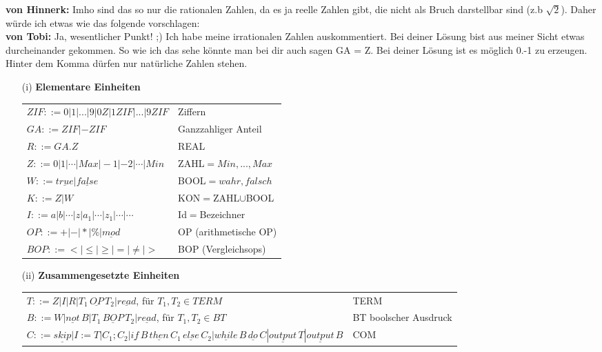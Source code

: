 \documentclass[ngerman,a4paper]{report}
\begin{document}
\textbf{von Hinnerk:}
Imho sind das so nur die rationalen Zahlen, da es ja reelle Zahlen gibt, die nicht als Bruch darstellbar sind (z.b $\sqrt{2}$).
Daher würde ich etwas wie das folgende vorschlagen:\\
\textbf{von Tobi:}
Ja, wesentlicher Punkt! ;) Ich habe meine irrationalen Zahlen auskommentiert. Bei deiner Lösung bist aus meiner Sicht etwas durcheinander gekommen. So wie ich das sehe könnte man bei dir auch sagen GA = Z. Bei deiner Lösung ist es möglich 0.-1 zu erzeugen. Hinter dem Komma dürfen nur natürliche Zahlen stehen.\\ 
\begin{itemize}
	\item[(i)] \textbf{Elementare Einheiten}\\
\begin{tabular}{l l}
			$ZIF::=0|1|...|9|0Z|1ZIF|...|9ZIF$ &Ziffern\\
			$GA::=ZIF|-ZIF$&Ganzzahliger Anteil\\
			$R::=GA.Z$&REAL\\
			$Z::= 0|1|\cdots|Max|-1|-2|\cdots|Min$& ZAHL$={Min,...,Max}$\\
			$W::=\underline{true}|\underline{false}$& BOOL$={wahr,falsch}$\\
			$K::=Z|W$& KON$=$ZAHL$\cup$BOOL\\
			$I::=a|b|\cdots|z|a_1|\cdots|z_1|\cdots|\cdots$& Id$=$Bezeichner\\
			$OP::=+|-|*|\%|\underline{mod}$& OP (arithmetische OP) \\
			$BOP::=<|\leq|\geq|=|\neq|>$& BOP (Vergleichsops)\\
\end{tabular}
\item[(ii)]\textbf{Zusammengesetzte Einheiten}\\
	\begin{tabular}{l l}
		$T::=Z|I|R|T_1\, \underline{OP}\, T_2|\underline{read}$, für $T_1,T_2\in TERM$& TERM\\
		$B::=W|\underline{not} \,B|T_1\, \underline{BOP}\, T_2|\underline{read}$, für $T_1,T_2\in BT$& BT	boolscher Ausdruck\\
		$C::= \underline{skip}|I:=T|C_1;C_2|\underline{if}\,  B\, \underline{then}\,  C_1\,  \underline{else}\,  C_2|\underline{while}\, B\, \underline{do}\, C|\underline{output}\,  T|\underline{output}\,  B$& COM\\
\end{tabular}
\end{itemize}
\end{document}
